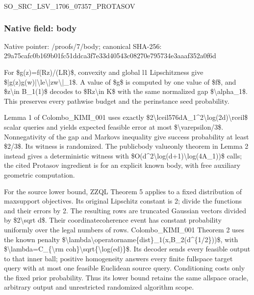 \documentclass[10pt,a4paper]{article}
\begin{document}
SO\_SRC\_LSV\_1706\_07357\_PROTASOV


\subsubsection{Native field: body}


Native pointer: /proofs/7/body; canonical SHA-256: 29a75cafc0b169b01fc51ddc\allowbreak{}a3f7e33d40543c08270e7957\allowbreak{}34e3aaaf352a0f6d


For \$g(z)=f(Rz)/(LR)\$, convexity and global l1 Lipschitzness give \$|g(z)g(w)|\textbackslash{}le\textbackslash{}|zw\textbackslash{}|\_1\$. A value of \$g\$ is computed by one value of \$f\$, and \$z\textbackslash{}in B\_1(1)\$ decodes to \$Rz\textbackslash{}in K\$ with the same normalized gap \$\textbackslash{}alpha\_1\$. This preserves every pathwise budget and the perinstance seed probability.

Lemma 1 of Colombo\_KIMI\_001 uses exactly \$2\textbackslash{}lceil576dA\_1\textasciicircum{}2\textbackslash{}log(2d)\textbackslash{}rceil\$ scalar queries and yields expected feasible error at most \$\textbackslash{}varepsilon/3\$. Nonnegativity of the gap and Markovs inequality give success probability at least \$2/3\$. Its witness is randomized. The publicbody valueonly theorem in Lemma 2 instead gives a deterministic witness with \$O(d\textasciicircum{}2\textbackslash{}log(d+1)\textbackslash{}log(4A\_1))\$ calls; the cited Protasov ingredient is for an explicit known body, with free auxiliary geometric computation.

For the source lower bound, ZZQL Theorem 5 applies to a fixed distribution of maxsupport objectives. Its original Lipschitz constant is 2; divide the functions and their errors by 2. The resulting rows are truncated Gaussian vectors divided by \$2\textbackslash{}sqrt d\$. Their coordinatecoherence event has constant probability uniformly over the legal numbers of rows. Colombo\_KIMI\_001 Theorem 2 uses the known penalty \$\textbackslash{}lambda\textbackslash{}operatorname\{di\allowbreak{}st\}\_1(x,B\_2(d\textasciicircum{}\{1/2\}))\$, with \$\textbackslash{}lambda=C\_\{\textbackslash{}rm coh\}\textbackslash{}sqrt\{\textbackslash{}log(ed)\}\$. Its decoder sends every feasible output to that inner ball; positive homogeneity answers every finite fullspace target query with at most one feasible Euclidean source query. Conditioning costs only the fixed prior probability. Thus its lower bound retains the same allspace oracle, arbitrary output and unrestricted randomized algorithm scope.
\end{document}
